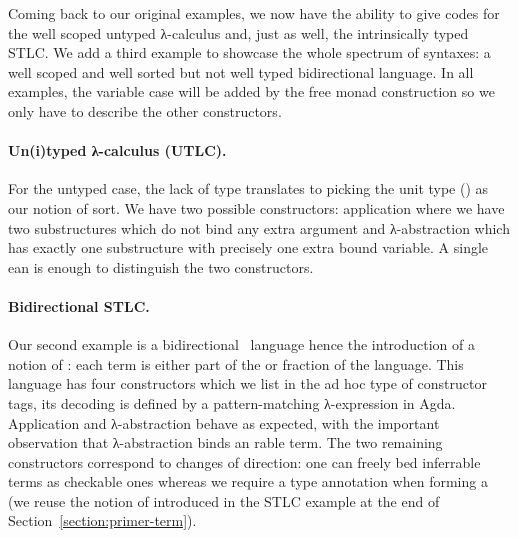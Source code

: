 
\begin{agdasnippet}
\end{agdasnippet}

Coming back to our original examples, we now have the ability to give
codes for the well scoped untyped λ-calculus and, just as well,
the intrinsically typed STLC. We add a third
example to showcase the whole spectrum of syntaxes: a well scoped and
well sorted but not well typed bidirectional language. In all examples,
the variable case will be added by the free monad construction so we only
have to describe the other constructors.


\paragraph*{Un(i)typed λ-calculus (UTLC).} For the untyped case, the lack of
type translates to picking the unit type () as our notion of sort.
We have two possible
constructors: application where we have two substructures which do not bind
any extra argument and λ-abstraction which has exactly one substructure
with precisely one extra bound variable. A single ean is enough to
distinguish the two constructors.

\begin{agdasnippet}
\end{agdasnippet}

\paragraph*{Bidirectional STLC.}\label{par:bidirectional} Our second example is a
bidirectional~\cite{pierce2000local} language hence the introduction of a
notion of : each term is either part of the  or
 fraction of the language. This language has four constructors
which we list in the ad hoc  type of constructor tags, its
decoding  is defined by a pattern-matching λ-expression in Agda.
Application and λ-abstraction behave as expected, with the important
observation that λ-abstraction binds an rable term. The two
remaining constructors correspond to changes of direction: one can freely
bed inferrable terms as checkable ones whereas we require a type
annotation when forming a  (we reuse the notion of  introduced
in the STLC example at the end of Section~\ref{section:primer-term}). %

